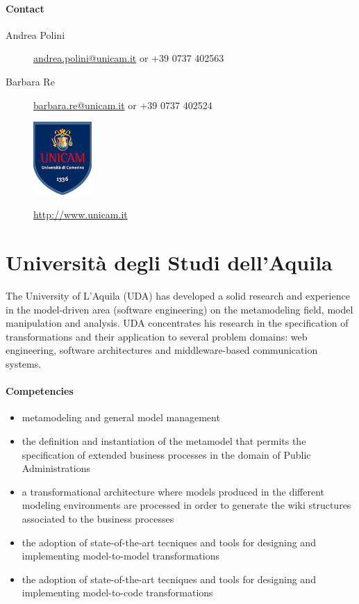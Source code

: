 \documentclass{learnpad}
\begin{document}
\paragraph{Contact}
\begin{description}
	\item[Andrea Polini] \href{mailto:andrea.polini@unicam.it}{andrea.polini@unicam.it} or +39 0737 402563
	\item[Barbara Re] \href{mailto:barbara.re@unicam.it}{barbara.re@unicam.it} or +39 0737 402524
\end{description}

\begin{figure}[!htp]
	\centering
	\includegraphics[width=6em,keepaspectratio]{figures/unicam.png}\par
	\url{http://www.unicam.it}
\end{figure}

\section{Università degli Studi dell'Aquila}
The University of L’Aquila (UDA) has developed a solid research and experience
in the model-driven area (software engineering) on the metamodeling field, model
manipulation and analysis.  UDA concentrates his research in the specification
of transformations and their application to several problem domains: web
engineering, software architectures and middleware-based communication systems.

\paragraph{Competencies}
\begin{itemize}
	\item metamodeling and general model management
	\item the definition and instantiation of the \learnpad metamodel that
		permits the specification of extended business processes in the domain
		of Public Administrations
	\item a transformational architecture where models produced in the different
		modeling environments are processed in order to generate the wiki
		structures associated to the business processes
	\item the adoption of state-of-the-art tecniques and tools for designing and
		implementing model-to-model transformations
	\item the adoption of state-of-the-art tecniques and tools for designing and
		implementing model-to-code transformations
\end{itemize}
\end{document}
